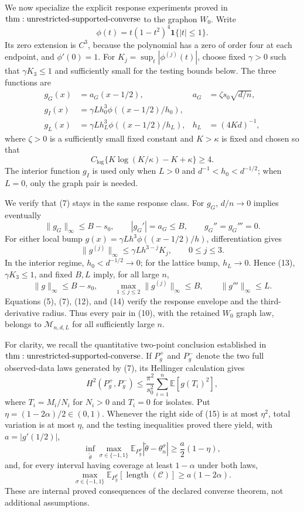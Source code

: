 We now specialize the explicit response experiments proved in \({\rm thm:unrestricted\text{-}supported\text{-}converse}\) to the graphon \(W_0\).  Write
\[
 \phi(t)=t(1-t^2)^4\mathbf1\{|t|\leq1\}.
\tag{9}
\]
Its zero extension is \(C^3\), because the polynomial has a zero of order four at each endpoint, and \(\phi'(0)=1\).  For \(K_j=\sup_t|\phi^{(j)}(t)|\), choose fixed \(\gamma>0\) such that \(\gamma K_3\leq1\) and sufficiently small for the testing bounds below.  The three functions are
\[
\begin{aligned}
 g_G(x)&=a_G(x-1/2),
 &a_G&=\zeta s_0\sqrt{d/n},\\
 g_I(x)&=\gamma Lh_0^3\phi((x-1/2)/h_0),&&\\
 g_L(x)&=\gamma Lh_L^3\phi((x-1/2)/h_L),
 &h_L&=(4Kd)^{-1},
\end{aligned}
\tag{10}
\]
where \(\zeta>0\) is a sufficiently small fixed constant and \(K>\kappa\) is fixed and chosen so that
\[
 C_{\log}\{K\log(K/\kappa)-K+\kappa\}\geq4.
\tag{11}
\]
The interior function \(g_I\) is used only when \(L>0\) and \(d^{-1}<h_0<d^{-1/2}\); when \(L=0\), only the graph pair is needed.

We verify that (7) stays in the same response class.  For \(g_G\), \(d/n\to0\) implies eventually
\[
 \|g_G\|_\infty\leq B-s_0,\qquad |g_G'|=a_G\leq B,\qquad
 g_G''=g_G'''=0.
\tag{12}
\]
For either local bump \(g(x)=\gamma Lh^3\phi((x-1/2)/h)\), differentiation gives
\[
 \|g^{(j)}\|_\infty\leq\gamma Lh^{3-j}K_j,\qquad 0\leq j\leq3.
\tag{13}
\]
In the interior regime, \(h_0<d^{-1/2}\to0\); for the lattice bump, \(h_L\to0\).  Hence (13), \(\gamma K_3\leq1\), and fixed \(B,L\) imply, for all large \(n\),
\[
 \|g\|_\infty\leq B-s_0,\qquad
 \max_{1\leq j\leq2}\|g^{(j)}\|_\infty\leq B,\qquad
 \|g'''\|_\infty\leq L.
\tag{14}
\]
Equations (5), (7), (12), and (14) verify the response envelope and the third-derivative radius.  Thus every pair in (10), with the retained \(W_0\) graph law, belongs to \(\mathcal M_{n,d,L}\) for all sufficiently large \(n\).

For clarity, we recall the quantitative two-point conclusion established in \({\rm thm:unrestricted\text{-}supported\text{-}converse}\).  If \(P_g^+\) and \(P_g^-\) denote the two full observed-data laws generated by (7), its Hellinger calculation gives
\[
 H^2(P_g^+,P_g^-)
 \leq\frac{\pi^2}{s_0^2}\sum_{i=1}^n\mathbb E[g(T_i)^2],
\tag{15}
\]
where \(T_i=M_i/N_i\) for \(N_i>0\) and \(T_i=0\) for isolates.  Put \(\eta=(1-2\alpha)/2\in(0,1)\).  Whenever the right side of (15) is at most \(\eta^2\), total variation is at most \(\eta\), and the testing inequalities proved there yield, with \(a=|g'(1/2)|\),
\[
 \inf_{\widetilde\theta}\max_{\sigma\in\{-1,1\}}
 \mathbb E_{P_g^\sigma}|\widetilde\theta-\theta_n^\sigma|
 \geq\frac a2(1-\eta),
\tag{16}
\]
and, for every interval having coverage at least \(1-\alpha\) under both laws,
\[
 \max_{\sigma\in\{-1,1\}}
 \mathbb E_{P_g^\sigma}[\operatorname{length}(\mathcal C)]
 \geq a(1-2\alpha).
\tag{17}
\]
These are internal proved consequences of the declared converse theorem, not additional assumptions.

